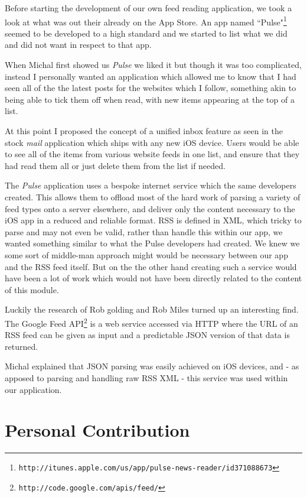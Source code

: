 \documentclass[a4paper,11pt]{article}
\begin{document}
	Before starting the development of our own feed reading application, we took a look at what was out their already on the App Store. An app named ``Pulse"\footnote{\texttt{http://itunes.apple.com/us/app/pulse-news-reader/id371088673}} seemed to be developed to a high standard and we started to list what we did and did not want in respect to that app.
	
	When Michal first showed us \emph{Pulse} we liked it but though it was too complicated, instead I personally wanted an application which allowed me to know that I had seen all of the the latest posts for the websites which I follow, something akin to being able to tick them off when read, with new items appearing at the top of a list.
	
	At this point I proposed the concept of a unified inbox feature as seen in the stock \emph{mail} application which ships with any new iOS device. Users would be able to see all of the items from various website feeds in one list, and ensure that they had read them all or just delete them from the list if needed.
	
	The \emph{Pulse} application uses a bespoke internet service which the same developers created. This allows them to offload most of the hard work of parsing a variety of feed types onto a server elsewhere, and deliver only the content necessary to the iOS app in a reduced and reliable format. RSS is defined in XML, which tricky to parse and may not even be valid, rather than handle this within our app, we wanted something similar to what the Pulse developers had created. We knew we some sort of middle-man approach might would be necessary between our app and the RSS feed itself. But on the the other hand creating such a service would have been a lot of work which would not have been directly related to the content of this module.
	
	Luckily the research of Rob golding and Rob Miles turned up an interesting find. The Google Feed API\footnote{\texttt{http://code.google.com/apis/feed/}} is a web service accessed via HTTP where the URL of an RSS feed can be given as input and a predictable JSON version of that data is returned.
	
	Michal explained that JSON parsing was easily achieved on iOS devices, and - as apposed to parsing and handling raw RSS XML - this service was used within our application.
	
	\section{Personal Contribution}
	
\end{document}

